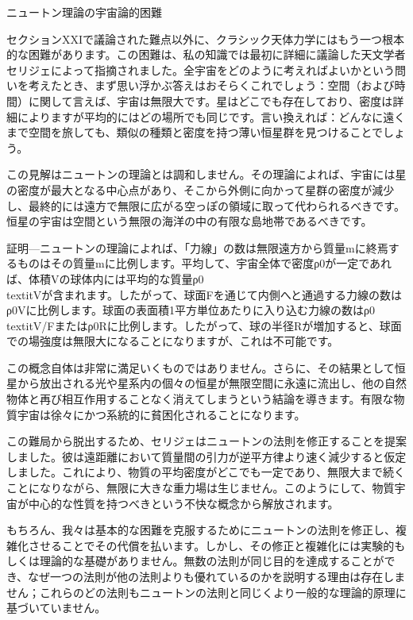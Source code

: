 \documentclass[a4paper,11pt,openany]{ltjsbook}
\begin{document}
ニュートン理論の宇宙論的困難

セクションXXIで議論された難点以外に、クラシック天体力学にはもう一つ根本的な困難があります。この困難は、私の知識では最初に詳細に議論した天文学者セリジェによって指摘されました。全宇宙をどのように考えればよいかという問いを考えたとき、まず思い浮かぶ答えはおそらくこれでしょう：空間（および時間）に関して言えば、宇宙は無限大です。星はどこでも存在しており、密度は詳細によりますが平均的にはどの場所でも同じです。言い換えれば：どんなに遠くまで空間を旅しても、類似の種類と密度を持つ薄い恒星群を見つけることでしょう。

この見解はニュートンの理論とは調和しません。その理論によれば、宇宙には星の密度が最大となる中心点があり、そこから外側に向かって星群の密度が減少し、最終的には遠方で無限に広がる空っぽの領域に取って代わられるべきです。恒星の宇宙は空間という無限の海洋の中の有限な島地帯であるべきです。

証明—ニュートンの理論によれば、「力線」の数は無限遠方から質量mに終焉するものはその質量mに比例します。平均して、宇宙全体で密度ρ0が一定であれば、体積Vの球体内には平均的な質量ρ0\\textit{Vが含まれます。したがって、球面Fを通じて内側へと通過する力線の数はρ0}Vに比例します。球面の表面積1平方単位あたりに入り込む力線の数はρ0\\textit{V/Fまたはρ0}Rに比例します。したがって、球の半径Rが増加すると、球面での場強度は無限大になることになりますが、これは不可能です。

この概念自体は非常に満足いくものではありません。さらに、その結果として恒星から放出される光や星系内の個々の恒星が無限空間に永遠に流出し、他の自然物体と再び相互作用することなく消えてしまうという結論を導きます。有限な物質宇宙は徐々にかつ系統的に貧困化されることになります。

この難局から脱出するため、セリジェはニュートンの法則を修正することを提案しました。彼は遠距離において質量間の引力が逆平方律より速く減少すると仮定しました。これにより、物質の平均密度がどこでも一定であり、無限大まで続くことになりながら、無限に大きな重力場は生じません。このようにして、物質宇宙が中心的な性質を持つべきという不快な概念から解放されます。

もちろん、我々は基本的な困難を克服するためにニュートンの法則を修正し、複雑化させることでその代償を払います。しかし、その修正と複雑化には実験的もしくは理論的な基礎がありません。無数の法則が同じ目的を達成することができ、なぜ一つの法則が他の法則よりも優れているのかを説明する理由は存在しません；これらのどの法則もニュートンの法則と同じくより一般的な理論的原理に基づいていません。
\end{document}
